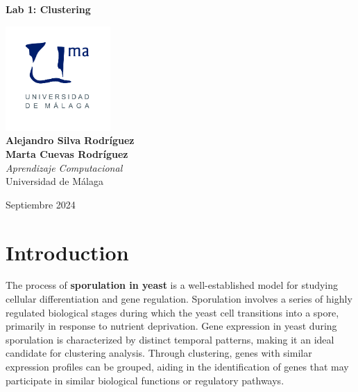 \documentclass{article}
\begin{document}
\begin{titlepage}
	\centering
	\vspace*{3cm}
	
	{\Huge \textbf{Lab 1: Clustering}\\[0.5cm]}
	
	\vspace{2cm}
	\includegraphics[width=0.3\textwidth]{images/uma_logo.jpg}\\[1cm]
	
	{\LARGE \textbf{Alejandro Silva Rodríguez}\\[0.5cm]}
	{\LARGE \textbf{Marta Cuevas Rodríguez}\\[0.5cm]}
	{\large \textit{Aprendizaje Computacional}\\
		Universidad de Málaga\\
		}
	
	\vfill
	
	{\large Septiembre 2024}
\end{titlepage}

\tableofcontents

\newpage

\section{Introduction}
The process of \textbf{sporulation in yeast} is a well-established model for studying cellular differentiation and gene regulation. Sporulation involves a series of highly regulated biological stages during which the yeast cell transitions into a spore, primarily in response to nutrient deprivation. Gene expression in yeast during sporulation is characterized by distinct temporal patterns, making it an ideal candidate for clustering analysis. Through clustering, genes with similar expression profiles can be grouped, aiding in the identification of genes that may participate in similar biological functions or regulatory pathways.
\end{document}
